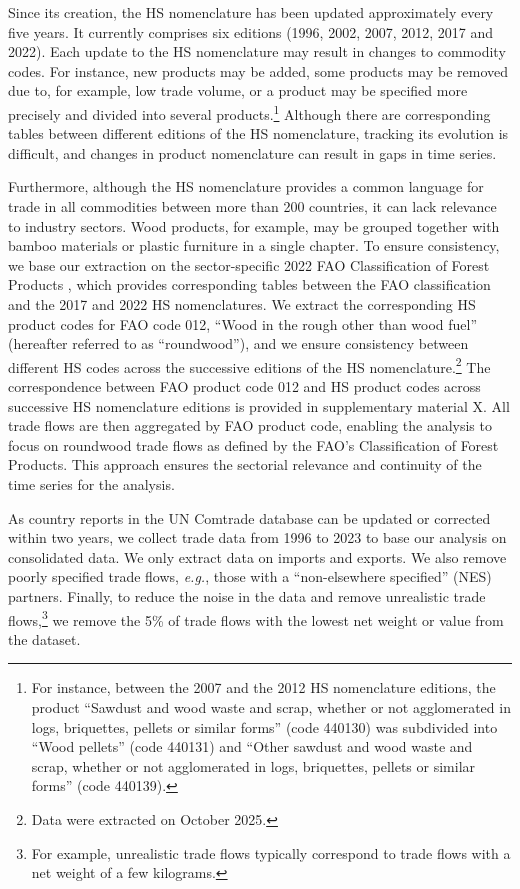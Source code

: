 \documentclass[
  authoryear,
  review,
  3p]{elsarticle}
\begin{document}
Since its creation, the HS nomenclature has been updated approximately
every five years. It currently comprises six editions (1996, 2002, 2007,
2012, 2017 and 2022). Each update to the HS nomenclature may result in
changes to commodity codes. For instance, new products may be added,
some products may be removed due to, for example, low trade volume, or a
product may be specified more precisely and divided into several
products.\footnote{For instance, between the 2007 and the 2012 HS
  nomenclature editions, the product ``Sawdust and wood waste and scrap,
  whether or not agglomerated in logs, briquettes, pellets or similar
  forms'' (code 440130) was subdivided into ``Wood pellets'' (code
  440131) and ``Other sawdust and wood waste and scrap, whether or not
  agglomerated in logs, briquettes, pellets or similar forms'' (code
  440139).} Although there are corresponding tables between different
editions of the HS nomenclature, tracking its evolution is difficult,
and changes in product nomenclature can result in gaps in time series.

Furthermore, although the HS nomenclature provides a common language for
trade in all commodities between more than 200 countries, it can lack
relevance to industry sectors. Wood products, for example, may be
grouped together with bamboo materials or plastic furniture in a single
chapter. To ensure consistency, we base our extraction on the
sector-specific 2022 FAO Classification of Forest Products
\citep{fao_classification_2022}, which provides corresponding tables
between the FAO classification and the 2017 and 2022 HS nomenclatures.
We extract the corresponding HS product codes for FAO code 012, ``Wood
in the rough other than wood fuel'' (hereafter referred to as
``roundwood''), and we ensure consistency between different HS codes
across the successive editions of the HS nomenclature.\footnote{Data
  were extracted on October 2025.} The correspondence between FAO
product code 012 and HS product codes across successive HS nomenclature
editions is provided in supplementary material X. All trade flows are
then aggregated by FAO product code, enabling the analysis to focus on
roundwood trade flows as defined by the FAO's Classification of Forest
Products. This approach ensures the sectorial relevance and continuity
of the time series for the analysis.

As country reports in the UN Comtrade database can be updated or
corrected within two years, we collect trade data from 1996 to 2023 to
base our analysis on consolidated data. We only extract data on imports
and exports. We also remove poorly specified trade flows, \emph{e.g.},
those with a ``non-elsewhere specified'' (NES) partners. Finally, to
reduce the noise in the data and remove unrealistic trade
flows,\footnote{For example, unrealistic trade flows typically
  correspond to trade flows with a net weight of a few kilograms.} we
remove the 5\% of trade flows with the lowest net weight or value from
the dataset.
\end{document}
